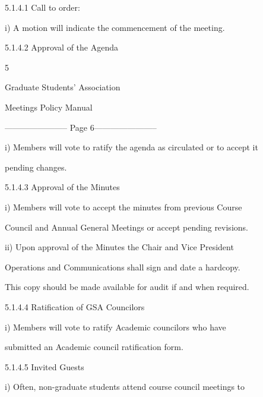   

5.1.4.1   Call to order:   

  

     i)       A motion will indicate the commencement of the meeting.   

  

5.1.4.2  Approval of the Agenda  



                                                            5  

                                         

                                      Graduate Students’ Association  

                                          Meetings Policy Manual  

  


----------------------- Page 6-----------------------

  

     i)       Members will vote to ratify the agenda as circulated or to accept it  

              pending changes.  

  

5.1.4.3  Approval of the Minutes  

  

     i)       Members  will  vote  to  accept  the  minutes  from  previous  Course  

              Council and Annual General Meetings or accept pending revisions.  

     ii)  Upon approval of the Minutes the Chair and Vice President  

              Operations and Communications shall sign and date a hardcopy.  

              This copy should be made available for audit if and when required.  

  

5.1.4.4  Ratification of GSA Councilors  

  

     i)       Members   will   vote   to   ratify   Academic   councilors   who   have  

              submitted an Academic council ratification form.  

  

5.1.4.5   Invited Guests  

  

     i)       Often,  non-graduate  students  attend  course  council  meetings  to  


